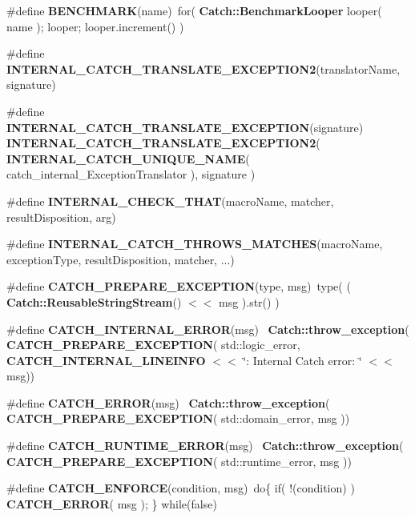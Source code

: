 \begin{DoxyCompactItemize}
\#define \textbf{ B\+E\+N\+C\+H\+M\+A\+RK}(name)~for( \textbf{ Catch\+::\+Benchmark\+Looper} looper( name ); looper; looper.\+increment() )
\item 
\#define \textbf{ I\+N\+T\+E\+R\+N\+A\+L\+\_\+\+C\+A\+T\+C\+H\+\_\+\+T\+R\+A\+N\+S\+L\+A\+T\+E\+\_\+\+E\+X\+C\+E\+P\+T\+I\+O\+N2}(translator\+Name,  signature)
\item 
\#define \textbf{ I\+N\+T\+E\+R\+N\+A\+L\+\_\+\+C\+A\+T\+C\+H\+\_\+\+T\+R\+A\+N\+S\+L\+A\+T\+E\+\_\+\+E\+X\+C\+E\+P\+T\+I\+ON}(signature)~\textbf{ I\+N\+T\+E\+R\+N\+A\+L\+\_\+\+C\+A\+T\+C\+H\+\_\+\+T\+R\+A\+N\+S\+L\+A\+T\+E\+\_\+\+E\+X\+C\+E\+P\+T\+I\+O\+N2}( \textbf{ I\+N\+T\+E\+R\+N\+A\+L\+\_\+\+C\+A\+T\+C\+H\+\_\+\+U\+N\+I\+Q\+U\+E\+\_\+\+N\+A\+ME}( catch\+\_\+internal\+\_\+\+Exception\+Translator ), signature )
\item 
\#define \textbf{ I\+N\+T\+E\+R\+N\+A\+L\+\_\+\+C\+H\+E\+C\+K\+\_\+\+T\+H\+AT}(macro\+Name,  matcher,  result\+Disposition,  arg)
\item 
\#define \textbf{ I\+N\+T\+E\+R\+N\+A\+L\+\_\+\+C\+A\+T\+C\+H\+\_\+\+T\+H\+R\+O\+W\+S\+\_\+\+M\+A\+T\+C\+H\+ES}(macro\+Name,  exception\+Type,  result\+Disposition,  matcher, ...)
\item 
\#define \textbf{ C\+A\+T\+C\+H\+\_\+\+P\+R\+E\+P\+A\+R\+E\+\_\+\+E\+X\+C\+E\+P\+T\+I\+ON}(type,  msg)~type( ( \textbf{ Catch\+::\+Reusable\+String\+Stream}() $<$$<$ msg ).str() )
\item 
\#define \textbf{ C\+A\+T\+C\+H\+\_\+\+I\+N\+T\+E\+R\+N\+A\+L\+\_\+\+E\+R\+R\+OR}(msg)~\textbf{ Catch\+::throw\+\_\+exception}(\textbf{ C\+A\+T\+C\+H\+\_\+\+P\+R\+E\+P\+A\+R\+E\+\_\+\+E\+X\+C\+E\+P\+T\+I\+ON}( std\+::logic\+\_\+error, \textbf{ C\+A\+T\+C\+H\+\_\+\+I\+N\+T\+E\+R\+N\+A\+L\+\_\+\+L\+I\+N\+E\+I\+N\+FO} $<$$<$ \char`\"{}\+: Internal Catch error\+: \char`\"{} $<$$<$ msg))
\item 
\#define \textbf{ C\+A\+T\+C\+H\+\_\+\+E\+R\+R\+OR}(msg)~\textbf{ Catch\+::throw\+\_\+exception}(\textbf{ C\+A\+T\+C\+H\+\_\+\+P\+R\+E\+P\+A\+R\+E\+\_\+\+E\+X\+C\+E\+P\+T\+I\+ON}( std\+::domain\+\_\+error, msg ))
\item 
\#define \textbf{ C\+A\+T\+C\+H\+\_\+\+R\+U\+N\+T\+I\+M\+E\+\_\+\+E\+R\+R\+OR}(msg)~\textbf{ Catch\+::throw\+\_\+exception}(\textbf{ C\+A\+T\+C\+H\+\_\+\+P\+R\+E\+P\+A\+R\+E\+\_\+\+E\+X\+C\+E\+P\+T\+I\+ON}( std\+::runtime\+\_\+error, msg ))
\item 
\#define \textbf{ C\+A\+T\+C\+H\+\_\+\+E\+N\+F\+O\+R\+CE}(condition,  msg)~do\{ if( !(condition) ) \textbf{ C\+A\+T\+C\+H\+\_\+\+E\+R\+R\+OR}( msg ); \} while(false)
$$
\end{DoxyCompactItemize}
